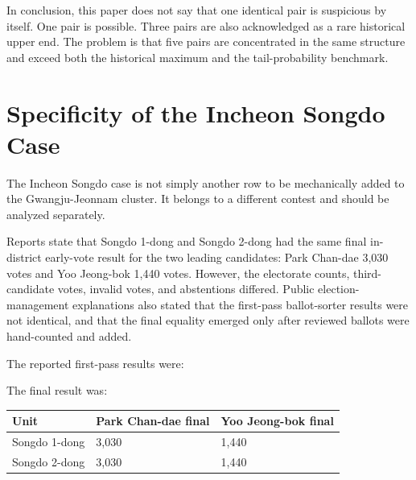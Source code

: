 \documentclass[preprint]{IEIE}
\begin{document}
In conclusion, this paper does not say that one identical pair is suspicious by itself. One pair is possible. Three pairs are also acknowledged as a rare historical upper end. The problem is that five pairs are concentrated in the same structure and exceed both the historical maximum and the tail-probability benchmark.

\section{Specificity of the Incheon Songdo Case}

The Incheon Songdo case is not simply another row to be mechanically added to the Gwangju-Jeonnam cluster. It belongs to a different contest and should be analyzed separately.

Reports state that Songdo 1-dong and Songdo 2-dong had the same final in-district early-vote result for the two leading candidates: Park Chan-dae 3,030 votes and Yoo Jeong-bok 1,440 votes. However, the electorate counts, third-candidate votes, invalid votes, and abstentions differed. Public election-management explanations also stated that the first-pass ballot-sorter results were not identical, and that the final equality emerged only after reviewed ballots were hand-counted and added.

The reported first-pass results were:

\begin{center}
\scriptsize
{}
\end{center}

The final result was:

\begin{center}
\small
\begin{tabular}{l l l}
\toprule
Unit & Park Chan-dae final & Yoo Jeong-bok final \\
\midrule
Songdo 1-dong & 3,030 & 1,440 \\
Songdo 2-dong & 3,030 & 1,440 \\
\bottomrule
\end{tabular}
\end{center}
\end{document}
